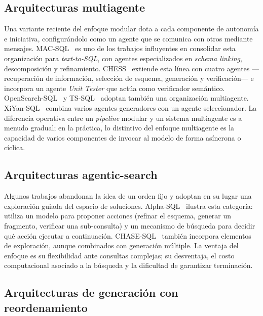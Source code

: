 \subsection{Arquitecturas multiagente}
\label{subsec:sota-d2-multiagente}

Una variante reciente del enfoque modular dota a cada componente de
autonomía e iniciativa, configurándolo como un agente que se comunica con
otros mediante mensajes. MAC-SQL~\cite{MAC-SQL2023} es uno de los
trabajos influyentes en consolidar esta organización para \emph{text-to-SQL},
con agentes especializados en \emph{schema linking}, descomposición y
refinamiento. CHESS~\cite{CHESS2024} extiende esta línea con cuatro
agentes ---recuperación de información, selección de esquema, generación
y verificación--- e incorpora un agente \emph{Unit Tester} que actúa como
verificador semántico. OpenSearch-SQL~\cite{OpenSearch-SQL2025} y
TS-SQL~\cite{TS-SQL2025} adoptan también una organización multiagente.
XiYan-SQL~\cite{XiYan-SQL2024} combina varios agentes generadores con un
agente seleccionador. La diferencia operativa entre un \emph{pipeline}
modular y un sistema multiagente es a menudo gradual; en la práctica, lo
distintivo del enfoque multiagente es la capacidad de varios componentes
de invocar al modelo de forma asíncrona o cíclica.

\subsection{Arquitecturas agentic-search}
\label{subsec:sota-d2-agentic}

Algunos trabajos abandonan la idea de un orden fijo y adoptan en su lugar
una exploración guiada del espacio de soluciones.
Alpha-SQL~\cite{Alpha-SQL2025} ilustra esta categoría: utiliza un modelo
para proponer acciones (refinar el esquema, generar un fragmento, verificar
una sub-consulta) y un mecanismo de búsqueda para decidir qué acción
ejecutar a continuación. CHASE-SQL~\cite{CHASE-SQL2025} también incorpora
elementos de exploración, aunque combinados con generación múltiple. La
ventaja del enfoque es su flexibilidad ante consultas complejas; su
desventaja, el costo computacional asociado a la búsqueda y la dificultad
de garantizar terminación.

\subsection{Arquitecturas de generación con reordenamiento}
\label{subsec:sota-d2-rerank}

